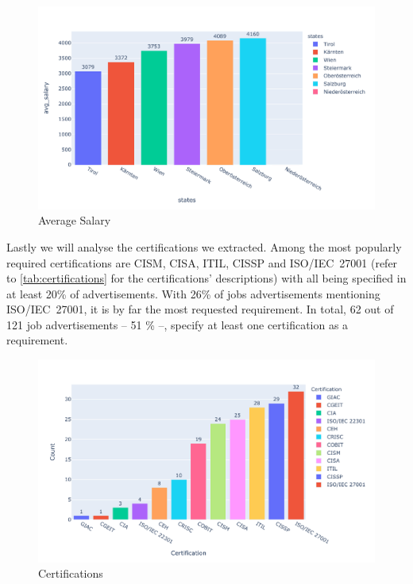 \documentclass[runningheads]{llncs}
\begin{document}
\begin{figure}[H]
	\centering
  \includegraphics[width=\textwidth]{average-salary-bar-chart.pdf}
	\caption{Average Salary}
	\label{fig:salary_chart}
\end{figure}

Lastly we will analyse the certifications we extracted. Among the most popularly required certifications are CISM, CISA, ITIL, CISSP and ISO/IEC~27001 (refer to \autoref{tab:certifications} for the certifications' descriptions) with all being specified in at least 20\% of advertisements. With 26\% of jobs advertisements mentioning ISO/IEC~27001, it is by far the most requested requirement. In total, 62 out of 121 job advertisements -- 51 \% --, specify at least one certification as a requirement.

\begin{figure}[H]
	\centering
  \includegraphics[width=\textwidth]{certifications-bar-chart.pdf}
	\caption{Certifications}
	\label{fig:certifications_chart}
\end{figure}
\end{document}
